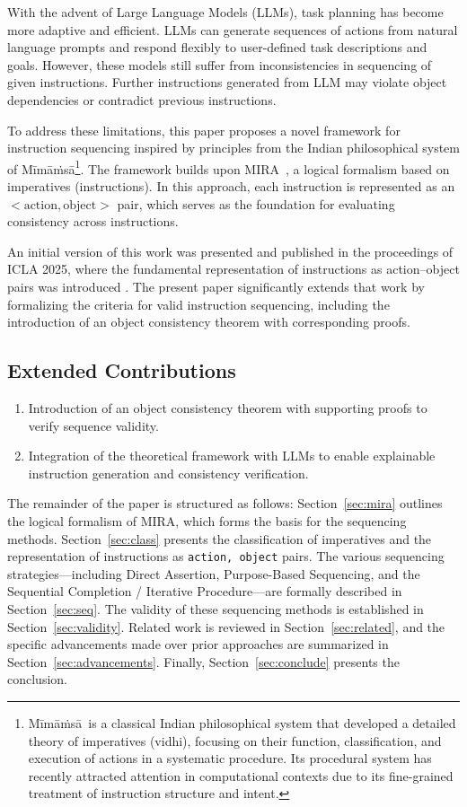 \documentclass[a4paper,11pt]{lmcs}
\newcommand{\mimamsa}{M\={i}m\={a}\.ms\={a}}
\begin{document}
With the advent of Large Language Models (LLMs), task planning has become more adaptive and efficient. LLMs can generate sequences of actions from natural language prompts and respond flexibly to user-defined task descriptions and goals. However, these models still suffer from inconsistencies in sequencing of given instructions. Further instructions generated from LLM may violate object dependencies or contradict previous instructions.

To address these limitations, this paper proposes a novel framework for instruction sequencing inspired by principles from the Indian philosophical system of \mimamsa\footnote{\mimamsa~is a classical Indian philosophical system that developed a detailed theory of imperatives (vidhi), focusing on their function, classification, and execution of actions in a systematic procedure. Its procedural system has recently attracted attention in computational contexts due to its fine-grained treatment of instruction structure and intent.}. The framework builds upon MIRA~\cite{mira}, a logical formalism based on imperatives (instructions). In this approach, each instruction is represented as an $<\text{action}, \text{object}>$ pair, which serves as the foundation for evaluating consistency across instructions.

An initial version of this work was presented and published in the proceedings of ICLA 2025, where the fundamental representation of instructions as action–object pairs was introduced \cite{llm_mira}. The present paper significantly extends that work by formalizing the criteria for valid instruction sequencing, including the introduction of an object consistency theorem with corresponding proofs.

\subsection*{Extended Contributions}
\begin{enumerate}
\item Introduction of an object consistency theorem with supporting proofs to verify sequence validity.
\item Integration of the theoretical framework with LLMs to enable explainable instruction generation and consistency verification.
\end{enumerate}

The remainder of the paper is structured as follows: Section~\ref{sec:mira} outlines the logical formalism of MIRA, which forms the basis for the sequencing methods. Section~\ref{sec:class} presents the classification of imperatives and the representation of instructions as \texttt{action, object} pairs. The various sequencing strategies—including Direct Assertion, Purpose-Based Sequencing, and the Sequential Completion / Iterative Procedure—are formally described in Section~\ref{sec:seq}. The validity of these sequencing methods is established in Section~\ref{sec:validity}. Related work is reviewed in Section~\ref{sec:related}, and the specific advancements made over prior approaches are summarized in Section~\ref{sec:advancements}. Finally, Section~\ref{sec:conclude} presents the conclusion.
\end{document}

